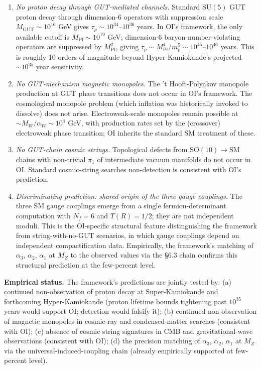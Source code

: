 \documentclass[
]{article}
\begin{document}
\begin{enumerate}
\def\labelenumi{(\roman{enumi})}
\item
  \emph{No proton decay through GUT-mediated channels.} Standard
  \(\mathrm{SU}(5)\) GUT proton decay through dimension-6 operators with
  suppression scale \(M_{\mathrm{GUT}} \sim 10^{16}\) GeV gives
  \(\tau_p \sim 10^{34}\)--\(10^{36}\) years. In OI's framework, the
  only available cutoff is \(M_{\mathrm{Pl}} \sim 10^{19}\) GeV;
  dimension-6 baryon-number-violating operators are suppressed by
  \(M_{\mathrm{Pl}}^2\), giving
  \(\tau_p \sim M_{\mathrm{Pl}}^4/m_p^5 \sim 10^{45}\)--\(10^{46}\)
  years. This is roughly 10 orders of magnitude beyond
  Hyper-Kamiokande's projected \(\sim 10^{35}\) year sensitivity.
\item
  \emph{No GUT-mechanism magnetic monopoles.} The 't Hooft-Polyakov
  monopole production at GUT phase transitions does not occur in OI's
  framework. The cosmological monopole problem (which inflation was
  historically invoked to dissolve) does not arise. Electroweak-scale
  monopoles remain possible at \(\sim M_W/\alpha_W \sim 10^4\) GeV, with
  production rates set by the (crossover) electroweak phase transition;
  OI inherits the standard SM treatment of these.
\item
  \emph{No GUT-chain cosmic strings.} Topological defects from
  \(\mathrm{SO}(10) \to \mathrm{SM}\) chains with non-trivial \(\pi_1\)
  of intermediate vacuum manifolds do not occur in OI. Standard
  cosmic-string searches non-detection is consistent with OI's
  prediction.
\item
  \emph{Discriminating prediction: shared origin of the three gauge
  couplings.} The three SM gauge couplings emerge from a single
  fermion-determinant computation with \(N_f = 6\) and \(T(R) = 1/2\);
  they are not independent moduli. This is the OI-specific structural
  feature distinguishing the framework from string-with-no-GUT
  scenarios, in which gauge couplings depend on independent
  compactification data. Empirically, the framework's matching of
  \(\alpha_3\), \(\alpha_2\), \(\alpha_1\) at \(M_Z\) to the observed
  values via the §6.3 chain confirms this structural prediction at the
  few-percent level.
\end{enumerate}

\textbf{Empirical status.} The framework's predictions are jointly
tested by: (a) continued non-observation of proton decay at
Super-Kamiokande and forthcoming Hyper-Kamiokande (proton lifetime
bounds tightening past \(10^{35}\) years would support OI; detection
would falsify it); (b) continued non-observation of magnetic monopoles
in cosmic-ray and condensed-matter searches (consistent with OI); (c)
absence of cosmic string signatures in CMB and gravitational-wave
observations (consistent with OI); (d) the precision matching of
\(\alpha_3\), \(\alpha_2\), \(\alpha_1\) at \(M_Z\) via the
universal-induced-coupling chain (already empirically supported at
few-percent level).
\end{document}
